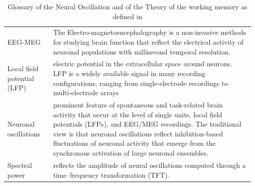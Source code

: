 \begin{table}[ht]
    \centering
    \begin{tabular}{@{}| p{4cm}|p{9cm}| @{}}
        \hline
        EEG-MEG                     & The Electro-magnetoencephalography is a non-invasive methods for studying brain function that reflect the electrical activity of neuronal populations with millisecond temporal resolution.                                                                                                                                                             \\

        Local field potential (LFP) & electric potential in the extracellular space around neurons. LFP is a widely available signal in many recording configurations, ranging from single-electrode recordings to multi-electrode arrays                                                                                                                                                     \\
        Neuronal oscillations       & prominent feature of spontaneous and task-related brain activity that occur at the level of single units, local field potentials (LFPs), and EEG/MEG recordings. The traditional view is that neuronal oscillations reflect inhibition-based fluctuations of neuronal activity that emerge from the synchronous activation of large neuronal ensembles. \\
        Spectral power              & reflects the amplitude of neural oscillations computed through a time–frequency transformation (TFT).                                                                                                                                                                                                                                                   \\
        \hline
    \end{tabular}
    \caption[Glossary of the Neural Oscillation and of the Theory of the working memory]%
    {Glossary of the Neural Oscillation and of the Theory of the working memory as defined in \cite{roux2014working}}
    \label{Tab:Glossary_theory}
\end{table}

